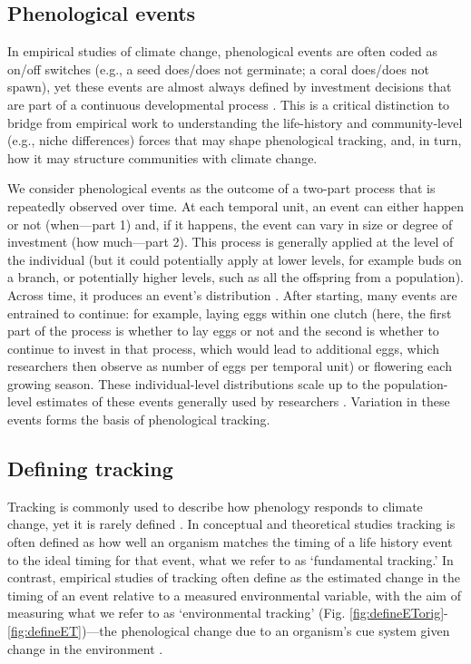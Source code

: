 \documentclass[11pt,letterpaper]{article}
\begin{document}
\subsection{Phenological events}
In empirical studies of climate change, phenological events are often coded as on/off switches (e.g., a seed does/does not germinate; a coral does/does not spawn), yet these events are almost always defined by investment decisions that are part of a continuous developmental process \citep{chuinearees,inouye2019}. This is a critical distinction to bridge from empirical work to understanding the life-history and community-level (e.g., niche differences) forces that may shape phenological tracking, and, in turn, how it may structure communities with climate change. 

We consider phenological events as the outcome of a two-part process that is repeatedly observed over time. At each temporal unit, an event can either happen or not (when---part 1) and, if it happens, the event can vary in size or degree of investment (how much---part 2). This process is generally applied at the level of the individual (but it could potentially apply at lower levels, for example buds on a branch, or potentially higher levels, such as all the offspring from a population). Across time, it produces an event's distribution \citep{gotelli1996,steer2019}. After starting, many events are entrained to continue: for example, laying eggs within one clutch (here, the first part of the process is whether to lay eggs or not and the second is whether to continue to invest in that process, which would lead to additional eggs, which researchers then observe as number of eggs per temporal unit) or flowering each growing season. These individual-level distributions scale up to the population-level estimates of these events generally used by researchers \citep[see][for discussion of the outcomes of this scaling]{inouye2019}. Variation in these events forms the basis of phenological tracking. 

\subsection{Defining tracking}
Tracking is commonly used to describe how phenology responds to climate change, yet it is rarely defined \citep[e.g.,][]{Menzel:2006xn,Parmesan:2006cr,Cleland:2012,deacy2018}. In conceptual and theoretical studies tracking is often defined as how well an organism matches the timing of a life history event to the ideal timing for that event, what we refer to as `fundamental tracking.' In contrast, empirical studies of tracking often define as the estimated change in the timing of an event relative to a measured environmental variable, with the aim of measuring what we refer to as `environmental tracking' (Fig. \ref{fig:defineETorig}-\ref{fig:defineET})---the phenological change due to an organism's cue system given change in the environment \citep[though most studies lack the required knowledge of the underlying cue system,][]{chmura2019}. 
\end{document}
